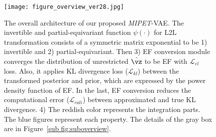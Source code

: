 \begin{figure}[t]
    \centering
    \centerline{\texttt{[image: figure\_overview\_ver28.jpg]}}
    \caption{The overall architecture of our proposed \textit{MIPET}-VAE.
    The invertible and partial-equivariant function $\psi(\cdot)$ for L2L transformation consists of a symmetric matrix exponential to be 1) invertible and 2) partial-equivariant.
    Then 3) EF conversion module converges the distribution of unrestricted $\hat{ \vz}$ to be EF with $\mathcal{L}_{el}$ loss.
    Also, it applies KL divergence loss ($\mathcal{L}_{kl}$) between the transformed posterior and prior, which are expressed by the power density function of EF.
    In the last, EF conversion reduces the computational error ($\mathcal{L}_{cali}$) between approximated and true KL divergence.
    4) The reddish color represents the integration parts. The blue figures represent each property.
     The details of the gray box are in Figure~\ref{sub fig:suboverview}.}
    \label{fig:overview}
\end{figure}






